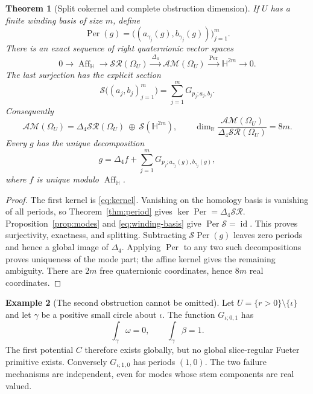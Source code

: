 \documentclass[11pt,a4paper]{article}
\numberwithin{equation}{section}
\newtheorem{theorem}{Theorem}[section]
\theoremstyle{definition}
\newtheorem{example}[theorem]{Example}
\theoremstyle{remark}
\newcommand{\R}{\mathbb R}
\newcommand{\HH}{\mathbb H}
\newcommand{\SR}{\mathcal{SR}}
\newcommand{\AM}{\mathcal{AM}}
\newcommand{\Aff}{\operatorname{Aff}_{\HH}}
\newcommand{\Fu}{\Delta_4}
\newcommand{\Per}{\operatorname{Per}}
\begin{document}
\begin{theorem}[Split cokernel and complete obstruction dimension]
\label{thm:split}
If $U$ has a finite winding basis of size $m$, define
\[
 \Per(g)=\bigl((a_{\gamma_j}(g),b_{\gamma_j}(g))\bigr)_{j=1}^m.
\]
There is an exact sequence of right quaternionic vector spaces
\begin{equation}
 0\longrightarrow\Aff\longrightarrow\SR(\Omega_U)
 \xrightarrow{\ \Fu\ }\AM(\Omega_U)
 \xrightarrow{\ \Per\ }\HH^{2m}\longrightarrow0.\label{eq:exact-sequence}
\end{equation}
The last surjection has the explicit section
\begin{equation}
 \mathcal S\bigl((a_j,b_j)_{j=1}^m\bigr)
       =\sum_{j=1}^mG_{p_j;a_j,b_j}.\label{eq:section}
\end{equation}
Consequently
\begin{equation}
 \AM(\Omega_U)=\Fu\SR(\Omega_U)\ \oplus\ \mathcal S(\HH^{2m}),
 \qquad
 \dim_{\R}\frac{\AM(\Omega_U)}{\Fu\SR(\Omega_U)}=8m.
 \label{eq:direct-sum}
\end{equation}
Every $g$ has the unique decomposition
\begin{equation}
 g=\Fu f+\sum_{j=1}^mG_{p_j;a_{\gamma_j}(g),b_{\gamma_j}(g)},
 \label{eq:decomposition}
\end{equation}
where $f$ is unique modulo $\Aff$.
\end{theorem}
\begin{proof}
The first kernel is \eqref{eq:kernel}. Vanishing on the homology basis is
vanishing of all periods, so Theorem~\ref{thm:period} gives
$\ker\Per=\Fu\SR$. Proposition~\ref{prop:modes} and
\eqref{eq:winding-basis} give $\Per\mathcal S=\operatorname{id}$.
This proves surjectivity, exactness, and splitting. Subtracting
$\mathcal S\Per(g)$ leaves zero periods and hence a global image of
$\Fu$. Applying $\Per$ to any two such decompositions proves uniqueness
of the mode part; the affine kernel gives the remaining ambiguity.
There are $2m$ free quaternionic coordinates, hence $8m$ real coordinates.
\end{proof}

\begin{example}[The second obstruction cannot be omitted]\label{ex:second}
Let $U=\{r>0\}\setminus\{\iota\}$ and let $\gamma$ be a positive small
circle about $\iota$. The function $G_{\iota;0,1}$ has
\[
 \int_\gamma\omega=0,\qquad\int_\gamma\beta=1.
\]
The first potential $C$ therefore exists globally, but no global
slice-regular Fueter primitive exists. Conversely $G_{\iota;1,0}$ has
periods $(1,0)$. The two failure mechanisms are independent, even for
modes whose stem components are real valued.
\end{example}
\end{document}
